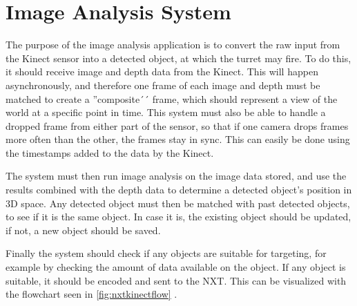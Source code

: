 \section{Image Analysis System}

\label{image_analysis_design}

The purpose of the image analysis application is to convert the raw input from the Kinect sensor into a detected
object, at which the turret may fire. To do this, it should receive image and depth data from the Kinect.
This will happen asynchronously, and therefore one frame of each image and depth must be matched to create a
''composite´´ frame, which should represent a view of the world at a specific point in time. This system must
also be able to handle a dropped frame from either part of the sensor, so that if one camera drops frames more
often than the other, the frames stay in sync. This can easily be done using the timestamps added to the data
by the Kinect.

The system must then run image analysis on the image data stored, and use the results combined with the depth
data to determine a detected object's position in 3D space. Any detected object must then be matched with past
detected objects, to see if it is the same object. In case it is, the existing object should be updated,
if not, a new object should be saved.

Finally the system should check if any objects are suitable for targeting, for example by checking the amount of
data available on the object. If any object is suitable, it should be encoded and sent to the NXT.
This can be visualized with the flowchart seen in \autoref{fig:nxtkinectflow} .

